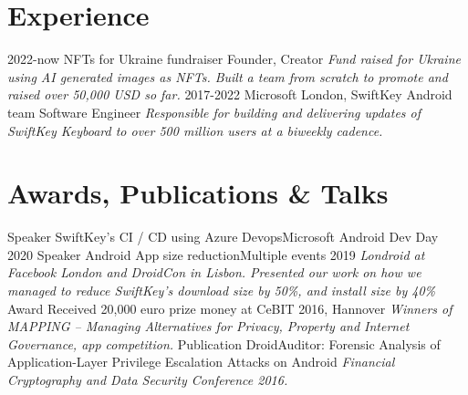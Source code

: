 \documentclass[]{friggeri-cv}
\begin{document}
\section{Experience}
    \begin{entrylist}
        \entry
            {2022-now}
            {NFTs for Ukraine fundraiser}
            {Founder, Creator}
            {\emph{Fund raised for Ukraine using AI generated images as NFTs. Built a team from scratch to promote and raised over 50,000 USD so far.}}
        \entry
            {2017-2022}
            {Microsoft London, SwiftKey Android team}
            {Software Engineer}
            {\emph{Responsible for building and delivering updates of SwiftKey Keyboard to over 500 million users at a biweekly cadence.}}
    \end{entrylist}

\section{Awards, Publications \& Talks}
	\begin{entrylist}
        \entry
            {Speaker}
            {SwiftKey’s CI / CD using Azure Devops}{Microsoft Android Dev Day 2020}
            {}
        \entry
            {Speaker}
            {Android App size reduction}{Multiple events 2019}
            {\emph{Londroid at Facebook London and DroidCon in Lisbon. Presented our work on how we managed to reduce SwiftKey's download size by 50\%, and install size by 40\%}}
        \entry
            {Award}
            {Received 20,000 euro prize money at CeBIT 2016, Hannover}{}
            {\emph{Winners of MAPPING -- Managing Alternatives for Privacy, Property and Internet Governance, app competition.}}
        \entry
            {Publication}
            {DroidAuditor: Forensic Analysis of Application-Layer Privilege Escalation Attacks on Android}{}
            {\emph{Financial Cryptography and Data Security Conference 2016.}}        
	\end{entrylist}
\end{document}
